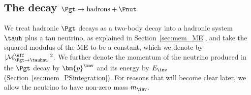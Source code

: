 \subsection{The decay $\Pgt \to \textrm{hadrons} + \Pnut$}
\label{sec:appendix_tauToHadDecays}

We treat hadronic $\Pgt$ decays as a two-body decay into a hadronic
system $\tauh$ plus a tau neutrino,
as explained in Section~\ref{sec:mem_ME},
and take the squared modulus of the ME to be a constant,
which we denote by $\vert\mathcal{M}^{\eff}_{\Pgt \to \tauhnu}\vert^{2}$.
We further denote the momentum of the neutrino produced in the $\Pgt$ decay by
$\bm{p}^{\inv}$ and its energy by $E_{\inv}$ (\cf Section~\ref{sec:mem_PSintegration}).
For reasons that will become clear later, we allow the neutrino to
have non-zero mass $m_{\inv}$.

